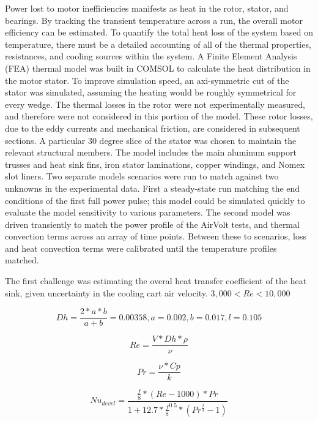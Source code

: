 \documentclass[]{aiaa-tc}%
\begin{document}
Power lost to motor inefficiencies manifests as heat in the rotor, stator, and bearings. By tracking the transient temperature across a run, the overall motor efficiency can be estimated. To quantify the total heat loss of the system based on temperature, there must be a detailed accounting of all of the thermal properties, resistances, and cooling sources within the system. A Finite Element Analysis (FEA) thermal model was built in COMSOL to calculate the heat distribution in the motor stator. To improve simulation speed, an axi-symmetric cut of the stator was simulated, assuming the heating would be roughly symmetrical for every wedge. The thermal losses in the rotor were not experimentally measured, and therefore were not considered in this portion of the model. These rotor losses, due to the eddy currents and mechanical friction, are considered in subsequent sections. A particular 30 degree slice of the stator was chosen to maintain the relevant structural members. The model includes the main aluminum support trusses and heat sink fins, iron stator laminations, copper windings, and Nomex slot liners. Two separate models scenarios were run to match against two unknowns in the experimental data. First a steady-state run matching the end conditions of the first full power pulse; this model could be simulated quickly to evaluate the model sensitivity to various parameters. The second model was driven transiently to match the power profile of the AirVolt tests, and thermal convection terms across an array of time points. Between these to scenarios, loss and heat convection terms were calibrated until the temperature profiles matched.

The first challenge was estimating the overal heat transfer coefficient of the heat sink, given uncertainty in the cooling cart air velocity.
$3,000<Re<10,000$

\begin{equation}
Dh = \frac{2*a*b}{a+b} = 0.00358,
a = 0.002, b = 0.017, l = 0.105
\label{eq:Dh}
\end{equation}

\begin{equation}
Re = \frac{V*Dh*\rho}{\nu}
\label{eq:Re}
\end{equation}

\begin{equation}
Pr = \frac{\nu*Cp}{k}
\label{eq:Pr}
\end{equation}

\begin{equation}
Nu_{devel} = \frac{\frac{f}{8}*(Re-1000)*Pr}{1+12.7*\frac{f}{8}^{0.5}*(Pr^{\frac{2}{3}}-1)}
\label{eq:Nu}
\end{equation}
\end{document}
